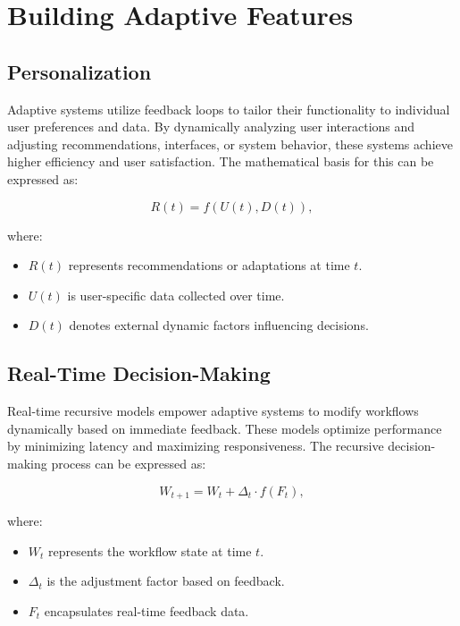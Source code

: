 \documentclass{article}
\theoremstyle{plain}
\begin{document}
\section{Building Adaptive Features}

\subsection{Personalization}
Adaptive systems utilize feedback loops to tailor their functionality to individual user preferences and data. By dynamically analyzing user interactions and adjusting recommendations, interfaces, or system behavior, these systems achieve higher efficiency and user satisfaction. The mathematical basis for this can be expressed as:

\begin{equation}
    R(t) = f(U(t), D(t)),
\end{equation}

where:
\begin{itemize}
    \item $R(t)$ represents recommendations or adaptations at time $t$.
    \item $U(t)$ is user-specific data collected over time.
    \item $D(t)$ denotes external dynamic factors influencing decisions.
\end{itemize}

\subsection{Real-Time Decision-Making}
Real-time recursive models empower adaptive systems to modify workflows dynamically based on immediate feedback. These models optimize performance by minimizing latency and maximizing responsiveness. The recursive decision-making process can be expressed as:

\begin{equation}
    W_{t+1} = W_t + \Delta_t \cdot f(F_t),
\end{equation}

where:
\begin{itemize}
    \item $W_t$ represents the workflow state at time $t$.
    \item $\Delta_t$ is the adjustment factor based on feedback.
    \item $F_t$ encapsulates real-time feedback data.
\end{itemize}
\end{document}
